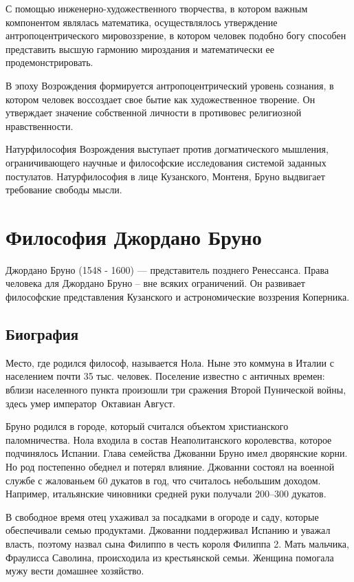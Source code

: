 \documentclass[a4paper, 14pt]{extreport}
\begin{document}
С помощью инженерно-художественного творчества, в котором важным
компонентом являлась математика, осуществлялось утверждение
антропоцентрического мировоззрение, в котором человек подобно богу
способен представить высшую гармонию мироздания и математически ее
продемонстрировать.

В эпоху Возрождения формируется антропоцентрический уровень сознания, в
котором человек воссоздает свое бытие как художественное творение. Он
утверждает значение собственной личности в противовес религиозной
нравственности.

Натурфилософия Возрождения выступает против догматического мышления,
ограничивающего научные и философские исследования системой заданных
постулатов. Натурфилософия в лице Кузанского, Монтеня, Бруно выдвигает
требование свободы мысли.

\section{Философия Джордано Бруно}

Джордано Бруно (1548 - 1600) --- представитель позднего Ренессанса.
Права человека для Джордано Бруно -- вне всяких ограничений. Он
развивает философские представления Кузанского и астрономические
воззрения Коперника.

\subsection{Биография}

Место, где родился философ, называется Нола. Ныне это коммуна в Италии с
населением почти 35 тыс. человек. Поселение известно с античных времен:
вблизи населенного пункта произошли три сражения Второй Пунической
войны, здесь умер император~Октавиан Август.

Бруно родился в городе, который считался объектом христианского
паломничества. Нола входила в состав Неаполитанского королевства,
которое подчинялось Испании. Глава семейства Джованни Бруно имел
дворянские корни. Но род постепенно обеднел и потерял влияние. Джованни
состоял на военной службе с жалованьем 60 дукатов в год, что считалось
небольшим доходом. Например, итальянские чиновники средней руки получали
200--300 дукатов.

В свободное время отец ухаживал за посадками в огороде и саду, которые
обеспечивали семью продуктами. Джованни поддерживал Испанию и уважал
власть, поэтому назвал сына Филиппо в честь короля Филиппа 2. Мать
мальчика, Фраулисса Саволина, происходила из крестьянской семьи. Женщина
помогала мужу вести домашнее хозяйство.
\end{document}
